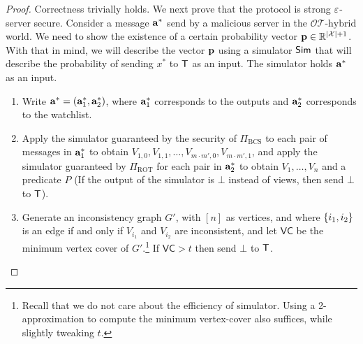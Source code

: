 \documentclass{llncs}
\newcommand{\bnote}[1]{\authnote{Bar}{#1}}
\newcommand{\OTfunc}{\mathcal{OT}}
\newcommand{\OThybrid}{\OTfunc\mbox{-}\text{hybrid}}
\newcommand{\sOT}[3]{\binom{#2}{#1}\text{-}#3\text{-string-OT}}
\newcommand{\rampOT}{\operatorname{ROT}}
\newcommand{\stb}{\operatorname{BCS}}
\newcommand{\X}{\mathcal{X}}
\newcommand{\W}{\mathcal{W}}
\newcommand{\p}{\myvec{p}}
\renewcommand{\a}{\myvec{a}}
\newcommand{\IKOPS}{\operatorname{IKOPS}}
\renewcommand{\Sc}{\mathsf{S}}
\newcommand{\Cc}{\mathsf{C}}
\newcommand{\VC}{\mathsf{VC}}
\begin{document}
\begin{proof}

Correctness trivially holds. We next prove that the protocol is strong $\varepsilon$-server secure. Consider a message $\a^*$ send by a malicious server in the $\OThybrid$ world. We need to show the existence of a certain probability vector $\p\in\R^{|\X|+1}$. With that in mind, we will describe the vector $\p$ using a simulator $\mathsf{Sim}$ that will describe the probability of sending $x^*$ to $\mathsf{T}$ as an input. The simulator holds $\a^*$ as an input.
\begin{enumerate}
	\item Write $\a^*=(\a^*_1,\a^*_2)$, where $\a^*_1$ corresponds to the outputs and $\a^*_2$ corresponds to the watchlist.
    
    \item Apply the simulator guaranteed by the security of $\Pi_{\stb}$ to each pair of messages in $\a^*_1$ to obtain $V_{1,0},V_{1,1},\ldots,V_{m\cdot m',0},V_{m\cdot m',1}$, and apply the simulator guaranteed by $\Pi_{\rampOT}$ for each pair in $\a^*_2$ to obtain $V_1,\ldots,V_n$ and a predicate $P$ (If the output of the simulator is $\bot$ instead of views, then send $\bot$ to $\mathsf{T}$).
    
    
    \item Generate an inconsistency graph $G'$, with $[n]$ as vertices, and where $\left\{i_1,i_2\right\}$ is an edge if and only if $V_{i_1}$ and $V_{i_2}$ are inconsistent, and let $\VC$ be the minimum vertex cover of $G'$.\footnote{Recall that we do not care about the efficiency of simulator. Using a 2-approximation to compute the minimum vertex-cover also suffices, while slightly tweaking $t$.} If $\VC>t$ then send $\bot$ to $\mathsf{T}$.
    

\end{enumerate}
\end{proof}
\end{document}
